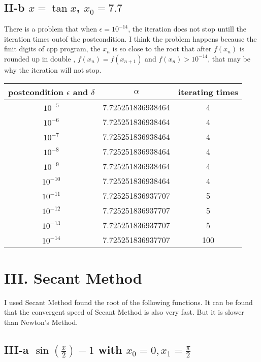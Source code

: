 \documentclass[twoside,a4paper]{article}
\begin{document}
\subsection*{II-b \small{$x = \tan x $, $x_0 = 7.7$}}
There is a problem that when $\epsilon = 10^{-14}$, the iteration does not stop untill the iteration times outof the postcondition. I think the problem happens because the finit digits of cpp program, the $x_n$ is so close to the root that after  $f
\left( x_n \right)$ is rounded up in double 
, $f(x_{n}) = f(x_{n+1})$ and $ f(x_n) > 10^{-14}$, that may be 
why the iteration will not stop.

\begin{tabular}{|c|c|c|}
\hline
postcondition  $\epsilon$ and $\delta$ & $\alpha$  & iterating times\\
\hline
$10^{-5}$ & 7.725251836938464 & 4\\
\hline
$10^{-6}$ & 7.725251836938464 & 4\\
\hline
$10^{-7}$ & 7.725251836938464 & 4\\
\hline
$10^{-8}$ & 7.725251836938464 & 4\\
\hline
$10^{-9}$ & 7.725251836938464 & 4\\
\hline
$10^{-10}$ & 7.725251836938464 & 4\\
\hline
$10^{-11}$ & 7.725251836937707 & 5\\
\hline
$10^{-12}$ & 7.725251836937707 & 5\\
\hline
$10^{-13}$ & 7.725251836937707 & 5\\
\hline
$10^{-14}$ & 7.725251836937707 & 100\\
\hline
\end{tabular}

\section*{III. \small{Secant Method}}

I used Secant Method found the root of the following functions.
It can be found that the convergent speed of Secant Method
is also very fast. But it is slower than Newton's Method. 
\subsection*{III-a \small{$\sin \left( \frac{x}{2} \right)-1 $
with $x_0=0,x_1=\frac{\pi}{2}$}}
\end{document}
